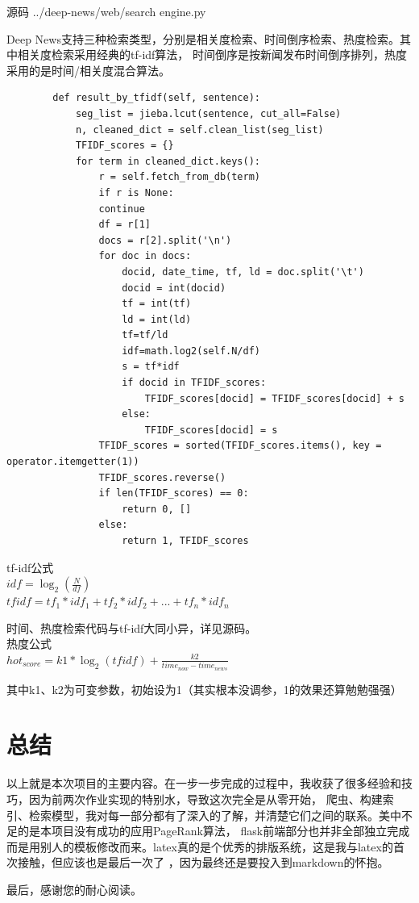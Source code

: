 \documentclass[12pt]{article}
\begin{document}
		源码 ../deep-news/web/search engine.py
		
		Deep News支持三种检索类型，分别是相关度检索、时间倒序检索、热度检索。其中相关度检索采用经典的tf-idf算法，
		时间倒序是按新闻发布时间倒序排列，热度采用的是时间/相关度混合算法。
		
		\begin{lstlisting}
		def result_by_tfidf(self, sentence):
			seg_list = jieba.lcut(sentence, cut_all=False)
			n, cleaned_dict = self.clean_list(seg_list)
			TFIDF_scores = {}
			for term in cleaned_dict.keys():
				r = self.fetch_from_db(term)
				if r is None:
				continue
				df = r[1]
				docs = r[2].split('\n')
				for doc in docs:
					docid, date_time, tf, ld = doc.split('\t')
					docid = int(docid)
					tf = int(tf)
					ld = int(ld)
					tf=tf/ld
					idf=math.log2(self.N/df)
					s = tf*idf
					if docid in TFIDF_scores:
						TFIDF_scores[docid] = TFIDF_scores[docid] + s
					else:
						TFIDF_scores[docid] = s
				TFIDF_scores = sorted(TFIDF_scores.items(), key = operator.itemgetter(1))
				TFIDF_scores.reverse()
				if len(TFIDF_scores) == 0:
					return 0, []
				else:
					return 1, TFIDF_scores
		\end{lstlisting}

		tf-idf公式
		~\\
		$ idf=\log_{2} (\frac{N}{df}) $
		~\\
		$ tfidf=tf_{1}*idf_{1}+tf_{2}*idf_{2}+...+tf_{n}*idf_{n} $
		
		时间、热度检索代码与tf-idf大同小异，详见源码。
		~\\
		热度公式
		~\\
		$hot_{score}=k1*\log_{2} (tfidf)+\frac{k2}{time_{now}-time_{news}} $
		
		其中k1、k2为可变参数，初始设为1（其实根本没调参，1的效果还算勉勉强强）
		
		\newpage
		
		\section{总结}
		
		以上就是本次项目的主要内容。在一步一步完成的过程中，我收获了很多经验和技巧，因为前两次作业实现的特别水，导致这次完全是从零开始，
		爬虫、构建索引、检索模型，我对每一部分都有了深入的了解，并清楚它们之间的联系。美中不足的是本项目没有成功的应用PageRank算法，
		flask前端部分也并非全部独立完成而是用别人的模板修改而来。latex真的是个优秀的排版系统，这是我与latex的首次接触，但应该也是最后一次了
		，因为最终还是要投入到markdown的怀抱。
		
		最后，感谢您的耐心阅读。
		
	
\end{document}
